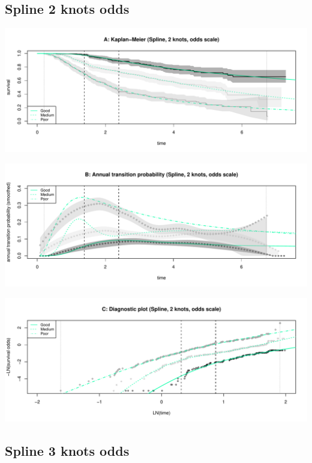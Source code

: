 \documentclass[]{article}
\begin{document}
\subsection{Spline 2 knots odds}\label{spline-2-knots-odds}

\begin{flushleft}\includegraphics[height=0.25\textheight]{Images/spline_odds2-1} \end{flushleft}

\begin{flushleft}\includegraphics[height=0.25\textheight]{Images/spline_odds2-2} \end{flushleft}

\begin{flushleft}\includegraphics[height=0.25\textheight]{Images/spline_odds2-3} \end{flushleft}

\newpage 

\subsection{Spline 3 knots odds}\label{spline-3-knots-odds}
\end{document}
